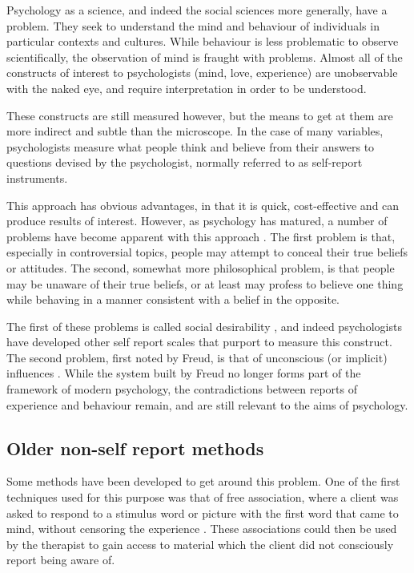 Psychology as a science, and indeed the social sciences more generally, have a problem. They seek to understand the mind and behaviour of individuals in particular contexts and cultures. While behaviour is less problematic to observe scientifically, the observation of mind is fraught with problems. Almost all of the constructs of interest to psychologists (mind, love, experience) are unobservable with the naked eye, and require interpretation in order to be understood. 

These constructs are still measured however, but the means to get at them are more indirect and subtle than the microscope. In the case of many variables, psychologists measure what people think and believe from their answers to questions devised by the psychologist, normally referred to as self-report instruments. 

This approach has obvious advantages, in that it is quick, cost-effective and can produce results of interest. However, as psychology has matured, a number of problems have become apparent with this approach \cite{Nisbett1977}.  The first problem is that, especially in controversial topics, people may attempt to conceal their true beliefs or attitudes. The second, somewhat more philosophical problem, is that people may be unaware of their true beliefs, or at least may profess to believe one thing while behaving in a manner consistent with a belief in the opposite. 

The first of these problems is called social desirability \cite{Egloff2003}, and indeed psychologists have developed other self report scales that purport to measure this construct. The second problem, first noted by Freud, is that of unconscious (or implicit) influences \cite{Hofmann2008}. While the system built by Freud no longer forms part of the framework of modern psychology, the contradictions between reports of experience and behaviour remain, and are still relevant to the aims of psychology. %

\subsection{Older non-self report methods}
\label{sec:older-non-self}

Some methods have been developed to get around this problem. One of the first techniques used for this purpose was that of free association, where a client was asked to respond to a stimulus word or picture with the first word that came to mind, without censoring the experience \cite{Hofmann2008}. These associations could then be used by the therapist to gain access to material which the client did not consciously report being aware of. 

